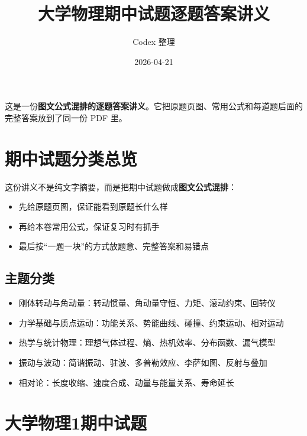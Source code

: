 \documentclass[12pt,a4paper]{ctexart}
\title{大学物理期中试题逐题答案讲义}
\author{Codex 整理}
\date{2026-04-21}
\begin{document}
\maketitle

\begin{tcolorbox}[title=讲义定位,colback=yellow!4!white,colframe=orange!60!black]
这是一份\textbf{图文公式混排的逐题答案讲义}。它把原题页图、常用公式和每道题后面的完整答案放到了同一份 PDF 里。
\end{tcolorbox}

\tableofcontents
\clearpage


\section{期中试题分类总览}

\begin{tcolorbox}[title=这一份讲义怎么用,colback=green!3!white,colframe=green!45!black]
这份讲义不是纯文字摘要，而是把期中试题做成\textbf{图文公式混排}：
\begin{itemize}
\item 先给原题页图，保证能看到原题长什么样
\item 再给本卷常用公式，保证复习时有抓手
\item 最后按“一题一块”的方式放题意、完整答案和易错点
\end{itemize}
\end{tcolorbox}

\subsection{主题分类}

\begin{itemize}
\item 刚体转动与角动量：转动惯量、角动量守恒、力矩、滚动约束、回转仪
\item 力学基础与质点运动：功能关系、势能曲线、碰撞、约束运动、相对运动
\item 热学与统计物理：理想气体过程、熵、热机效率、分布函数、漏气模型
\item 振动与波动：简谐振动、驻波、多普勒效应、李萨如图、反射与叠加
\item 相对论：长度收缩、速度合成、动量与能量关系、寿命延长
\end{itemize}


\clearpage

\section{大学物理1期中试题}
\end{document}
